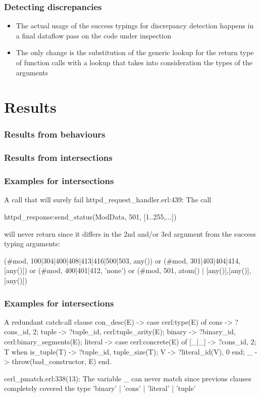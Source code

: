 \documentclass{beamer}
\begin{document}
\begin{frame}
  \frametitle{Detecting discrepancies}
  \begin{itemize}
    \item The actual usage of the success typings for discrepancy
      detection happens in a final dataflow pass on the code under
      inspection
    \item The only change is the substitution of the generic lookup
      for the return type of function calls with a lookup that takes
      into consideration the types of the arguments
  \end{itemize}
\end{frame}

\section{Results}

\begin{frame}
  \frametitle{Results from behaviours}
  
\end{frame}

\begin{frame}
  \frametitle{Results from intersections}
  
\end{frame}

\begin{frame}[fragile]
  \frametitle{Examples for intersections}
  \begin{code}{A call that will surely fail}
httpd_request_handler.erl:439: The call

  httpd_response:send_status(ModData, 501, [1..255,...])

  will never return since it differs in the 2nd and/or
  3rd argument from the success typing arguments:

  (#mod{}, 100|304|400|408|413|416|500|503, any()) or
  (#mod{}, 301|403|404|414, [any()]) or
  (#mod{}, 400|401|412, 'none') or
  (#mod{}, 501, {atom() | [any()],[any()],[any()]})

\end{code}
\end{frame}

\begin{frame}[fragile]
  \frametitle{Examples for intersections}
\begin{code}{A redundant catch-all clause}
con_desc(E) ->
  case cerl:type(E) of
    cons -> {?cons_id, 2};
    tuple -> {?tuple_id, cerl:tuple_arity(E)};
    binary -> {?binary_id, cerl:binary_segments(E)};
    literal -> case cerl:concrete(E) of
                 [_|_] -> {?cons_id, 2};
                 T when is_tuple(T) ->
                   {?tuple_id, tuple_size(T)};
                 V -> {?literal_id(V), 0}
               end;
    _ ->
      throw({bad_constructor, E})
  end.

cerl_pmatch.erl:338(13): The variable _ can never match
since previous clauses completely covered the type
'binary' | 'cons' | 'literal' | 'tuple'
\end{code}

\end{frame}
\end{document}
